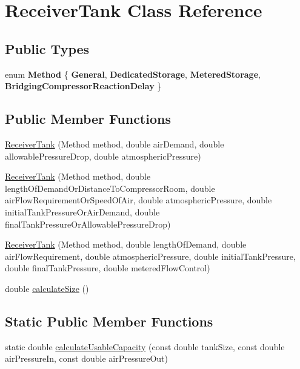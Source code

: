 \hypertarget{class_receiver_tank}{}\section{Receiver\+Tank Class Reference}
\label{class_receiver_tank}
\subsection*{Public Types}
\begin{DoxyCompactItemize}
\item 
\mbox{\label{class_receiver_tank_a8abbc7bc7f04ab853e1334c8905e5832}} 
enum {\bfseries Method} \{ {\bfseries General}, 
{\bfseries Dedicated\+Storage}, 
{\bfseries Metered\+Storage}, 
{\bfseries Bridging\+Compressor\+Reaction\+Delay}
 \}
\end{DoxyCompactItemize}
\subsection*{Public Member Functions}
\begin{DoxyCompactItemize}
\item 
\hyperlink{class_receiver_tank_ad41df65fb570224e135eae7b16c15b81}{Receiver\+Tank} (Method method, double air\+Demand, double allowable\+Pressure\+Drop, double atmospheric\+Pressure)
\item 
\hyperlink{class_receiver_tank_a499e102ca118bfe3bdff3584310207c2}{Receiver\+Tank} (Method method, double length\+Of\+Demand\+Or\+Distance\+To\+Compressor\+Room, double air\+Flow\+Requirement\+Or\+Speed\+Of\+Air, double atmospheric\+Pressure, double initial\+Tank\+Pressure\+Or\+Air\+Demand, double final\+Tank\+Pressure\+Or\+Allowable\+Pressure\+Drop)
\item 
\hyperlink{class_receiver_tank_aba0ca17714d1009c79d6dfcfaa3cea6a}{Receiver\+Tank} (Method method, double length\+Of\+Demand, double air\+Flow\+Requirement, double atmospheric\+Pressure, double initial\+Tank\+Pressure, double final\+Tank\+Pressure, double metered\+Flow\+Control)
\item 
double \hyperlink{class_receiver_tank_a5841344b63c444e4ceb9c3b7daeaf613}{calculate\+Size} ()
\end{DoxyCompactItemize}
\subsection*{Static Public Member Functions}
\begin{DoxyCompactItemize}
\item 
static double \hyperlink{class_receiver_tank_ad17f86b7de728d4796ee5b9663dcc577}{calculate\+Usable\+Capacity} (const double tank\+Size, const double air\+Pressure\+In, const double air\+Pressure\+Out)
\end{DoxyCompactItemize}


